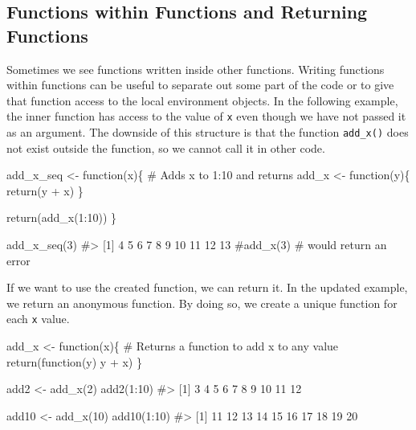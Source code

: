 \documentclass[
  letterpaper,
]{latex/krantz}
\makeatletter
\newenvironment{Shaded}{\begin{snugshade}}{\end{snugshade}}
\newcommand{\CommentTok}[1]{\textcolor[rgb]{0.37,0.37,0.37}{#1}}
\newcommand{\ControlFlowTok}[1]{\textcolor[rgb]{0.00,0.23,0.31}{#1}}
\newcommand{\DecValTok}[1]{\textcolor[rgb]{0.68,0.00,0.00}{#1}}
\newcommand{\FunctionTok}[1]{\textcolor[rgb]{0.28,0.35,0.67}{#1}}
\newcommand{\NormalTok}[1]{\textcolor[rgb]{0.00,0.23,0.31}{#1}}
\newcommand{\OtherTok}[1]{\textcolor[rgb]{0.00,0.23,0.31}{#1}}
\newcommand{\SpecialCharTok}[1]{\textcolor[rgb]{0.37,0.37,0.37}{#1}}
\newenvironment{kframe}{%
\medskip{}
\setlength{\fboxsep}{.8em}
 \def\at@end@of@kframe{}%
 \ifinner\ifhmode%
  \def\at@end@of@kframe{\end{minipage}}%
  \begin{minipage}{\columnwidth}%
 \fi\fi%
 \def\FrameCommand##1{\hskip\@totalleftmargin \hskip-\fboxsep
 \colorbox{shadecolor}{##1}\hskip-\fboxsep
     \hskip-\linewidth \hskip-\@totalleftmargin \hskip\columnwidth}%
 \MakeFramed {\advance\hsize-\width
   \@totalleftmargin\z@ \linewidth\hsize
   \@setminipage}}%
 {\par\unskip\endMakeFramed%
 \at@end@of@kframe}
\renewenvironment{Shaded}{\begin{kframe}}{\end{kframe}}
\makeatother
\begin{document}
\subsection{\texorpdfstring{Functions within Functions and Returning
Functions 
}{Functions within Functions and Returning Functions  }}\label{functions-within-functions-and-returning-functions}

Sometimes we see functions written inside other functions. Writing
functions within functions can be useful to separate out some part of
the code or to give that function access to the local environment
objects. In the following example, the inner function has access to the
value of \texttt{x} even though we have not passed it as an argument.
The downside of this structure is that the function \texttt{add\_x()}
does not exist outside the function, so we cannot call it in other code.

\begin{Shaded}
\begin{Highlighting}[]
\NormalTok{add\_x\_seq }\OtherTok{\textless{}{-}} \ControlFlowTok{function}\NormalTok{(x)\{}
  \CommentTok{\# Adds x to 1:10 and returns}
\NormalTok{  add\_x }\OtherTok{\textless{}{-}} \ControlFlowTok{function}\NormalTok{(y)\{}
      \FunctionTok{return}\NormalTok{(y }\SpecialCharTok{+}\NormalTok{ x)}
\NormalTok{  \}}
    
  \FunctionTok{return}\NormalTok{(}\FunctionTok{add\_x}\NormalTok{(}\DecValTok{1}\SpecialCharTok{:}\DecValTok{10}\NormalTok{))}
\NormalTok{\}}

\FunctionTok{add\_x\_seq}\NormalTok{(}\DecValTok{3}\NormalTok{)}
\CommentTok{\#\textgreater{}  [1]  4  5  6  7  8  9 10 11 12 13}
\CommentTok{\#add\_x(3) \# would return an error}
\end{Highlighting}
\end{Shaded}

If we want to use the created function, we can return it. In the updated
example, we return an anonymous function. By doing so, we create a
unique function for each \texttt{x} value.

\begin{Shaded}
\begin{Highlighting}[]
\NormalTok{add\_x }\OtherTok{\textless{}{-}} \ControlFlowTok{function}\NormalTok{(x)\{}
  \CommentTok{\# Returns a function to add x to any value}
  \FunctionTok{return}\NormalTok{(}\ControlFlowTok{function}\NormalTok{(y) y }\SpecialCharTok{+}\NormalTok{ x)}
\NormalTok{\}}

\NormalTok{add2 }\OtherTok{\textless{}{-}} \FunctionTok{add\_x}\NormalTok{(}\DecValTok{2}\NormalTok{)}
\FunctionTok{add2}\NormalTok{(}\DecValTok{1}\SpecialCharTok{:}\DecValTok{10}\NormalTok{)}
\CommentTok{\#\textgreater{}  [1]  3  4  5  6  7  8  9 10 11 12}

\NormalTok{add10 }\OtherTok{\textless{}{-}} \FunctionTok{add\_x}\NormalTok{(}\DecValTok{10}\NormalTok{)}
\FunctionTok{add10}\NormalTok{(}\DecValTok{1}\SpecialCharTok{:}\DecValTok{10}\NormalTok{)}
\CommentTok{\#\textgreater{}  [1] 11 12 13 14 15 16 17 18 19 20}
\end{Highlighting}
\end{Shaded}
\end{document}
